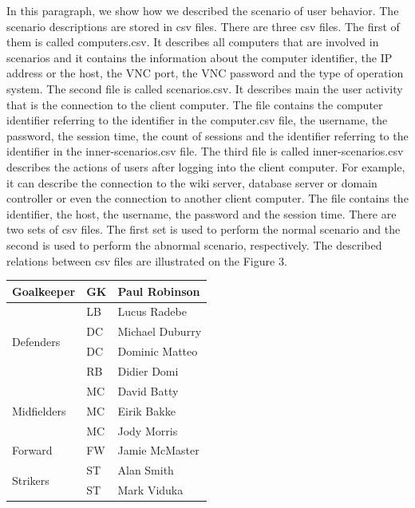 In this paragraph, we show how we described the scenario of user behavior. The scenario descriptions are stored in csv files. There are three csv files. The first of them is called computers.csv. It describes all computers that are involved in scenarios and it contains the information about the computer identifier, the IP address or the host, the VNC port, the VNC password and the type of operation system.
The second file is called scenarios.csv. It describes main the user activity that is the connection to the client computer. The file contains the computer identifier referring to the identifier in the computer.csv file, the username, the password, the session time, the count of sessions and the identifier referring to the identifier in the inner-scenarios.csv file. The third file is called inner-scenarios.csv describes the actions of users after logging into the client computer. For example, it can describe the connection to the wiki server, database server or domain controller or even the connection to another client computer. The file contains the identifier, the host, the username, the password and the session time. There are two sets of csv files. The first set is used to perform the normal scenario and the second is used to perform the abnormal scenario, respectively. The described relations between csv files are illustrated on the Figure 3.
 	

\begin{tabular}{ |l|l|l| }
\hline
Goalkeeper & GK & Paul Robinson \\ \hline
\multirow{4}{*}{Defenders} & LB & Lucus Radebe \\
 & DC & Michael Duburry \\
 & DC & Dominic Matteo \\
 & RB & Didier Domi \\ \hline
\multirow{3}{*}{Midfielders} & MC & David Batty \\
 & MC & Eirik Bakke \\
 & MC & Jody Morris \\ \hline
Forward & FW & Jamie McMaster \\ \hline
\multirow{2}{*}{Strikers} & ST & Alan Smith \\
 & ST & Mark Viduka \\
\hline
\end{tabular}






 
% 
